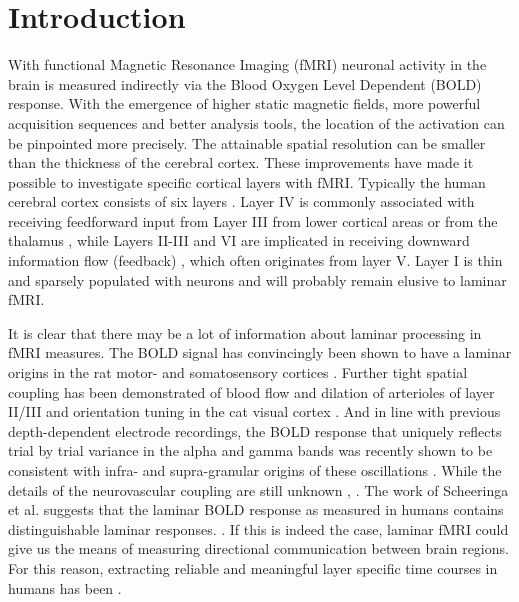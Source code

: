 \section{Introduction}
With functional Magnetic Resonance Imaging (fMRI) neuronal activity in the brain is measured indirectly via the Blood Oxygen Level Dependent (BOLD) response. With the emergence of higher static magnetic fields, more powerful acquisition sequences and better analysis tools, the location of the activation can be pinpointed  more  precisely. The attainable spatial resolution can be  smaller than the thickness of the cerebral cortex. These improvements have made it possible to investigate specific cortical layers with fMRI.
Typically the human cerebral cortex consists of six  layers \cite{Brodmann1909}. Layer IV is commonly associated with receiving feedforward input from Layer III from lower cortical areas or from the thalamus \cite{Jones1998}, while Layers II-III and VI are implicated in receiving downward information flow (feedback) \cite{Alitto2003}, which often originates from layer V. Layer I is thin and sparsely populated with neurons and will probably remain elusive to laminar fMRI. 

It is clear that there may be a lot of information about laminar processing in fMRI measures. The BOLD signal has convincingly been shown to have a laminar origins in the rat motor- and somatosensory cortices \cite{Yu2014}. Further tight spatial coupling has been demonstrated of blood flow and dilation of arterioles of layer II/III and orientation tuning in the cat visual cortex \cite{OHerron2016}. And in line with previous depth-dependent electrode recordings, the BOLD response that uniquely reflects trial by trial variance in the alpha and gamma bands was recently shown to be consistent with infra- and supra-granular origins of these oscillations \cite{Scheeringa2016}. While the details of the neurovascular coupling are still unknown \cite{Uludag2017},  \cite{Markuerkiaga2016}. The work of Scheeringa et al. suggests that the laminar BOLD response as measured in humans \cite[e.g.]{Koopmans2010,Polimeni2010,Maass2014,Kok2016} contains distinguishable laminar responses.  \cite{Huber2017}.
If this is indeed the case, laminar fMRI could give us the means of measuring directional communication between brain regions. For this reason, extracting reliable and meaningful layer specific time courses in humans has been  \cite{Barazany2012,Lawrence2017}. 

